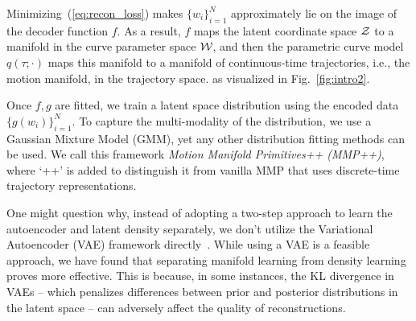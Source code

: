 Minimizing~(\ref{eq:recon_loss}) makes $\{w_i\}_{i=1}^{N}$ approximately lie on the image of the decoder function $f$. 
As a result, $f$ maps the latent coordinate space ${\cal Z}$ to a manifold in the curve parameter space ${\cal W}$, 
and then the parametric curve model $q(\tau; \cdot)$ maps this manifold to a manifold of continuous-time trajectories, i.e., the motion manifold, in the trajectory space. as visualized in Fig.~\ref{fig:intro2}.



Once $f, g$ are fitted, we train a latent space distribution using the encoded data $\{g(w_i)\}_{i=1}^{N}$. To capture the multi-modality of the distribution, we use a Gaussian Mixture Model (GMM), yet any other distribution fitting methods can be used.
We call this framework {\it Motion Manifold Primitives++ (MMP++)}, where `++' is added to distinguish it from vanilla MMP that uses discrete-time trajectory representations. 

One might question why, instead of adopting a two-step approach to learn the autoencoder and latent density separately, we don't utilize the Variational Autoencoder (VAE) framework directly~\cite{kingma2013auto}. While using a VAE is a feasible approach, we have found that separating manifold learning from density learning proves more effective. This is because, in some instances, the KL divergence in VAEs -- which penalizes differences between prior and posterior distributions in the latent space -- can adversely affect the quality of reconstructions.  

